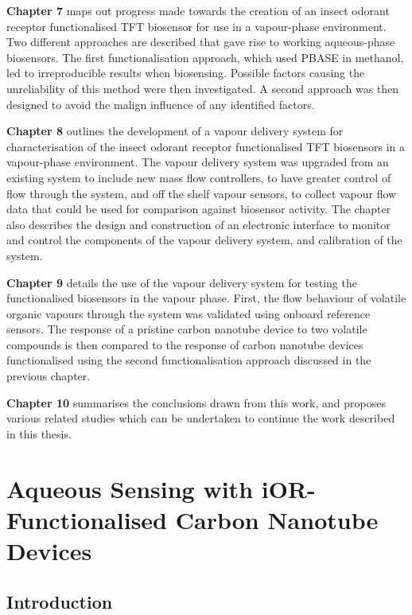 \documentclass[
  a4paper,
]{scrbook}
\begin{document}
\textbf{Chapter 7} maps out progress made towards the creation of an
insect odorant receptor functionalised TFT biosensor for use in a
vapour-phase environment. Two different approaches are described that
gave rise to working aqueous-phase biosensors. The first
functionalisation approach, which used PBASE in methanol, led to
irreproducible results when biosensing. Possible factors causing the
unreliability of this method were then investigated. A second approach
was then designed to avoid the malign influence of any identified
factors.

\textbf{Chapter 8} outlines the development of a vapour delivery system
for characterisation of the insect odorant receptor functionalised TFT
biosensors in a vapour-phase environment. The vapour delivery system was
upgraded from an existing system to include new mass flow controllers,
to have greater control of flow through the system, and off the shelf
vapour sensors, to collect vapour flow data that could be used for
comparison against biosensor activity. The chapter also describes the
design and construction of an electronic interface to monitor and
control the components of the vapour delivery system, and calibration of
the system.

\textbf{Chapter 9} details the use of the vapour delivery system for
testing the functionalised biosensors in the vapour phase. First, the
flow behaviour of volatile organic vapours through the system was
validated using onboard reference sensors. The response of a pristine
carbon nanotube device to two volatile compounds is then compared to the
response of carbon nanotube devices functionalised using the second
functionalisation approach discussed in the previous chapter.

\textbf{Chapter 10} summarises the conclusions drawn from this work, and
proposes various related studies which can be undertaken to continue the
work described in this thesis.


\hypertarget{sec-biosensing-iORs}{%
\chapter{Aqueous Sensing with iOR-Functionalised Carbon Nanotube
Devices}\label{sec-biosensing-iORs}}

\hypertarget{introduction-1}{%
\section{Introduction}\label{introduction-1}}
\end{document}
